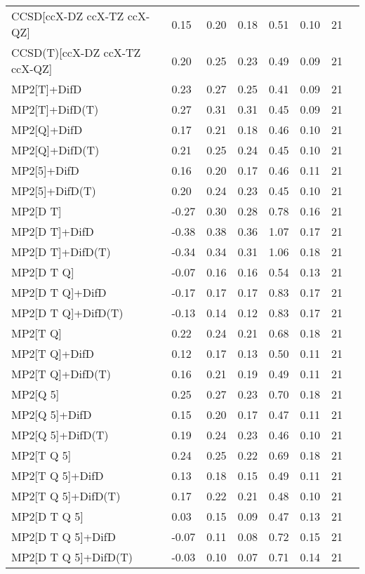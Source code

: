 \begin{table}
\begin{tabular}{l l l l l l l l }
    CCSD[ccX-DZ ccX-TZ ccX-QZ] & 0.15 & 0.20 & 0.18 & 0.51 & 0.10 & 21 \\ 
    CCSD(T)[ccX-DZ ccX-TZ ccX-QZ] & 0.20 & 0.25 & 0.23 & 0.49 & 0.09 & 21 \\ 
    MP2[T]+DifD & 0.23 & 0.27 & 0.25 & 0.41 & 0.09 & 21 \\ 
    MP2[T]+DifD(T) & 0.27 & 0.31 & 0.31 & 0.45 & 0.09 & 21 \\ 
    MP2[Q]+DifD & 0.17 & 0.21 & 0.18 & 0.46 & 0.10 & 21 \\ 
    MP2[Q]+DifD(T) & 0.21 & 0.25 & 0.24 & 0.45 & 0.10 & 21 \\ 
    MP2[5]+DifD & 0.16 & 0.20 & 0.17 & 0.46 & 0.11 & 21 \\ 
    MP2[5]+DifD(T) & 0.20 & 0.24 & 0.23 & 0.45 & 0.10 & 21 \\ 
    MP2[D T] & -0.27 & 0.30 & 0.28 & 0.78 & 0.16 & 21 \\ 
    MP2[D T]+DifD & -0.38 & 0.38 & 0.36 & 1.07 & 0.17 & 21 \\ 
    MP2[D T]+DifD(T) & -0.34 & 0.34 & 0.31 & 1.06 & 0.18 & 21 \\ 
    MP2[D T Q] & -0.07 & 0.16 & 0.16 & 0.54 & 0.13 & 21 \\ 
    MP2[D T Q]+DifD & -0.17 & 0.17 & 0.17 & 0.83 & 0.17 & 21 \\ 
    MP2[D T Q]+DifD(T) & -0.13 & 0.14 & 0.12 & 0.83 & 0.17 & 21 \\ 
    MP2[T Q] & 0.22 & 0.24 & 0.21 & 0.68 & 0.18 & 21 \\ 
    MP2[T Q]+DifD & 0.12 & 0.17 & 0.13 & 0.50 & 0.11 & 21 \\ 
    MP2[T Q]+DifD(T) & 0.16 & 0.21 & 0.19 & 0.49 & 0.11 & 21 \\ 
    MP2[Q 5] & 0.25 & 0.27 & 0.23 & 0.70 & 0.18 & 21 \\ 
    MP2[Q 5]+DifD & 0.15 & 0.20 & 0.17 & 0.47 & 0.11 & 21 \\ 
    MP2[Q 5]+DifD(T) & 0.19 & 0.24 & 0.23 & 0.46 & 0.10 & 21 \\ 
    MP2[T Q 5] & 0.24 & 0.25 & 0.22 & 0.69 & 0.18 & 21 \\ 
    MP2[T Q 5]+DifD & 0.13 & 0.18 & 0.15 & 0.49 & 0.11 & 21 \\ 
    MP2[T Q 5]+DifD(T) & 0.17 & 0.22 & 0.21 & 0.48 & 0.10 & 21 \\ 
    MP2[D T Q 5] & 0.03 & 0.15 & 0.09 & 0.47 & 0.13 & 21 \\ 
    MP2[D T Q 5]+DifD & -0.07 & 0.11 & 0.08 & 0.72 & 0.15 & 21 \\ 
    MP2[D T Q 5]+DifD(T) & -0.03 & 0.10 & 0.07 & 0.71 & 0.14 & 21 \\ 
    \bottomrule
  \end{tabular}
\end{table}
